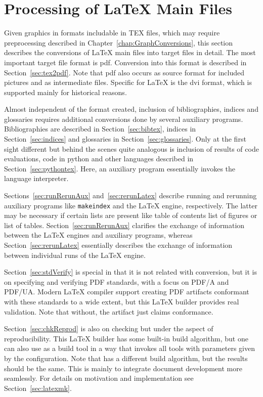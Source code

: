 
\chapter{Processing of \texorpdfstring{\LaTeX}{LaTeX} Main Files}\label{chap:latexMainConversions}

Given graphics in formats includable in TEX files, 
which may require preprocessing described in 
Chapter~\ref{chap:GraphConversions}, 
this section describes the conversions of \LaTeX{} main files 
into target files in detail. 
The most important target file format is \gls{pdf}. 
Conversion into this format is described in Section~\ref{sec:tex2pdf}. 
Note that \gls{pdf} also occurs as source format 
for included pictures and as intermediate files. 
Specific for \LaTeX{} is the \gls{dvi} format, 
which is supported mainly for historical reasons. 

Almost independent of the format created, 
inclusion of bibliographies, indices and glossaries 
requires additional conversions 
done by several auxiliary programs. 
Bibliographies are described in Section~\ref{sec:bibtex}, 
indices in Section~\ref{sec:indices} 
and glossaries in Section~\ref{sec:glossaries}. 
Only at the first sight different 
but behind the scenes quite analogous 
is inclusion of results of code evaluations, 
code in python and other languages described in Section~\ref{sec:pythontex}. 
Here, an auxiliary program essentially invokes the language interpreter. 

Sections~\ref{sec:runRerunAux} and~\ref{sec:rerunLatex} 
describe running and rerunning auxiliary programs 
like \texttt{makeindex} and the \LaTeX{} engine, respectively. 
The latter may be necessary if certain lists are present 
like table of contents list of figures or list of tables. 
Section~\ref{sec:runRerunAux} clarifies the exchange of information  
between the \LaTeX{} engines and auxiliary programs, 
whereas Section~\ref{sec:rerunLatex} 
essentially describes the exchange of information 
between individual runs of the \LaTeX{} engine. 

Section~\ref{sec:stdVerify} is special in that it is not related with conversion, 
but it is on specifying and verifying PDF standards, 
with a focus on PDF/A and PDF/UA\@. 
Modern \LaTeX{} compiler support creating PDF artifacts conformant with these standards 
to a wide extent, but this \LaTeX{} builder provides real validation. 
Note that without, the artifact just claims conformance. 

Section~\ref{sec:chkReprod} is also on checking 
but under the aspect of reproducibility. 
This \LaTeX{} builder has some built-in build algorithm, 
but one can also use  as a build tool 
in a way that invokes all tools with parameters given by the configuration. 
Note that  has a different build algorithm, 
but the results should be the same. 
This is mainly to integrate document development more seamlessly. 
For details on motivation and implementation see Section~\ref{sec:latexmk}. 

